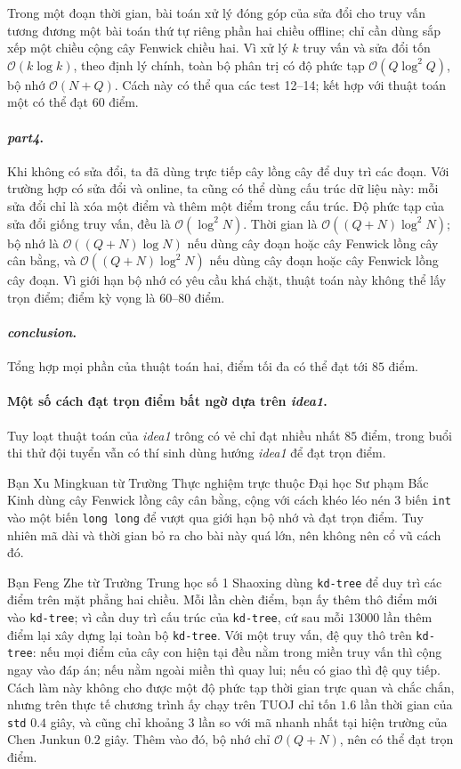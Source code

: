 \documentclass[11pt]{article}
\newcommand{\Oh}{\mathcal{O}}
\begin{document}
Trong một đoạn thời gian, bài toán xử lý đóng góp của sửa đổi cho truy vấn
tương đương một bài toán thứ tự riêng phần hai chiều offline; chỉ cần dùng sắp
xếp một chiều cộng cây Fenwick chiều hai. Vì xử lý \(k\) truy vấn và sửa đổi
tốn \(\Oh(k\log k)\), theo định lý chính, toàn bộ phân trị có độ phức tạp
\(\Oh(Q\log^2 Q)\), bộ nhớ \(\Oh(N+Q)\). Cách này có thể qua các test
12--14; kết hợp với thuật toán một có thể đạt \(60\) điểm.

\paragraph{\emph{part4}.}
Khi không có sửa đổi, ta đã dùng trực tiếp cây lồng cây để duy trì các đoạn.
Với trường hợp có sửa đổi và online, ta cũng có thể dùng cấu trúc dữ liệu này:
mỗi sửa đổi chỉ là xóa một điểm và thêm một điểm trong cấu trúc. Độ phức tạp
của sửa đổi giống truy vấn, đều là \(\Oh(\log^2 N)\). Thời gian là
\(\Oh((Q+N)\log^2 N)\); bộ nhớ là \(\Oh((Q+N)\log N)\) nếu dùng cây đoạn hoặc
cây Fenwick lồng cây cân bằng, và \(\Oh((Q+N)\log^2 N)\) nếu dùng cây đoạn
hoặc cây Fenwick lồng cây đoạn. Vì giới hạn bộ nhớ có yêu cầu khá chặt, thuật
toán này không thể lấy trọn điểm; điểm kỳ vọng là \(60\)--\(80\) điểm.

\paragraph{\emph{conclusion}.}
Tổng hợp mọi phần của thuật toán hai, điểm tối đa có thể đạt tới \(85\) điểm.

\paragraph{Một số cách đạt trọn điểm bất ngờ dựa trên \emph{idea1}.}
Tuy loạt thuật toán của \emph{idea1} trông có vẻ chỉ đạt nhiều nhất
\(85\) điểm, trong buổi thi thử đội tuyển vẫn có thí sinh dùng hướng
\emph{idea1} để đạt trọn điểm.

Bạn Xu Mingkuan từ Trường Thực nghiệm trực thuộc Đại học Sư phạm Bắc Kinh dùng
cây Fenwick lồng cây cân bằng, cộng với cách khéo léo nén \(3\) biến
\texttt{int} vào một biến \texttt{long long} để vượt qua giới hạn bộ nhớ và
đạt trọn điểm. Tuy nhiên mã dài và thời gian bỏ ra cho bài này quá lớn, nên
không nên cổ vũ cách đó.

Bạn Feng Zhe từ Trường Trung học số 1 Shaoxing dùng \texttt{kd-tree} để duy
trì các điểm trên mặt phẳng hai chiều. Mỗi lần chèn điểm, bạn ấy thêm thô điểm
mới vào \texttt{kd-tree}; vì cần duy trì cấu trúc của \texttt{kd-tree}, cứ sau
mỗi \(13000\) lần thêm điểm lại xây dựng lại toàn bộ \texttt{kd-tree}. Với một
truy vấn, đệ quy thô trên \texttt{kd-tree}: nếu mọi điểm của cây con hiện tại
đều nằm trong miền truy vấn thì cộng ngay vào đáp án; nếu nằm ngoài miền thì
quay lui; nếu có giao thì đệ quy tiếp. Cách làm này không cho được một độ phức
tạp thời gian trực quan và chắc chắn, nhưng trên thực tế chương trình ấy chạy
trên TUOJ chỉ tốn \(1.6\) lần thời gian của \texttt{std} \(0.4\) giây, và cũng
chỉ khoảng \(3\) lần so với mã nhanh nhất tại hiện trường của Chen Junkun
\(0.2\) giây. Thêm vào đó, bộ nhớ chỉ \(\Oh(Q+N)\), nên có thể đạt trọn điểm.
\end{document}
